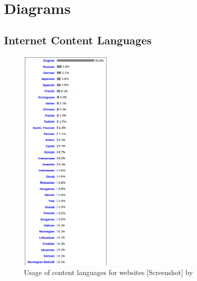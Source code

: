 \chapter{Diagrams}

\section{Internet Content Languages}

\begin{figure}[H]
	\centering
	\includegraphics[height=30em]{diagrams/w3techsInternetContentLang.png}
	\caption{Usage of content languages for websites [Screenshot] by \citet{appendixDia:01}}
	\label{fig:w3techLang}
\end{figure}

